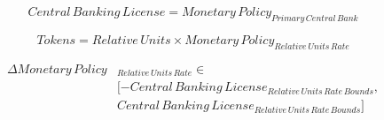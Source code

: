 \documentclass[fleqn]{article}
\begin{document}
	
	\Large
	
	\begin{equation}
		Central \, Banking \, License = Monetary \, Policy_{Primary \, Central \, Bank}
	\end{equation}
	
	\begin{equation}
		Tokens = Relative \, Units \times Monetary \, Policy_{Relative \, Units \, Rate}
	\end{equation}

	\begin{equation}
	\begin{split}
		\Delta  Monetary \, Policy&_{Relative \, Units \, Rate} \in \\ 
		&[-Central \, Banking \, License_{Relative \, Units \, Rate \, Bounds}, \\
		&Central \, Banking \, License_{Relative \, Units \, Rate \, Bounds}]
	\end{split}
	\end{equation}
\end{document}
